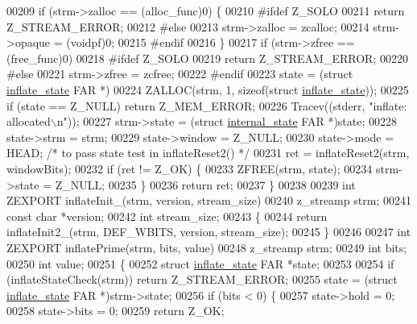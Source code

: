 \begin{DoxyCode}
00209     \textcolor{keywordflow}{if} (strm->zalloc == (alloc\_func)0) \{
00210 \textcolor{preprocessor}{#ifdef Z\_SOLO}
00211         \textcolor{keywordflow}{return} Z\_STREAM\_ERROR;
00212 \textcolor{preprocessor}{#else}
00213         strm->zalloc = zcalloc;
00214         strm->opaque = (voidpf)0;
00215 \textcolor{preprocessor}{#endif}
00216     \}
00217     \textcolor{keywordflow}{if} (strm->zfree == (free\_func)0)
00218 #ifdef Z\_SOLO
00219         \textcolor{keywordflow}{return} Z\_STREAM\_ERROR;
00220 \textcolor{preprocessor}{#else}
00221         strm->zfree = zcfree;
00222 \textcolor{preprocessor}{#endif}
00223     state = (\textcolor{keyword}{struct }\hyperlink{structinflate__state}{inflate\_state} FAR *)
00224             ZALLOC(strm, 1, \textcolor{keyword}{sizeof}(\textcolor{keyword}{struct} \hyperlink{structinflate__state}{inflate\_state}));
00225     \textcolor{keywordflow}{if} (state == Z\_NULL) \textcolor{keywordflow}{return} Z\_MEM\_ERROR;
00226     Tracev((stderr, \textcolor{stringliteral}{"inflate: allocated\(\backslash\)n"}));
00227     strm->state = (\textcolor{keyword}{struct }\hyperlink{structinternal__state}{internal\_state} FAR *)state;
00228     state->strm = strm;
00229     state->window = Z\_NULL;
00230     state->mode = HEAD;     \textcolor{comment}{/* to pass state test in inflateReset2() */}
00231     ret = inflateReset2(strm, windowBits);
00232     \textcolor{keywordflow}{if} (ret != Z\_OK) \{
00233         ZFREE(strm, state);
00234         strm->state = Z\_NULL;
00235     \}
00236     \textcolor{keywordflow}{return} ret;
00237 \}
00238 
00239 \textcolor{keywordtype}{int} ZEXPORT inflateInit\_(strm, version, stream\_size)
00240 z\_streamp strm;
00241 \textcolor{keyword}{const} \textcolor{keywordtype}{char} *version;
00242 \textcolor{keywordtype}{int} stream\_size;
00243 \{
00244     \textcolor{keywordflow}{return} inflateInit2\_(strm, DEF\_WBITS, version, stream\_size);
00245 \}
00246 
00247 \textcolor{keywordtype}{int} ZEXPORT inflatePrime(strm, bits, value)
00248 z\_streamp strm;
00249 \textcolor{keywordtype}{int} bits;
00250 \textcolor{keywordtype}{int} value;
00251 \{
00252     \textcolor{keyword}{struct }\hyperlink{structinflate__state}{inflate\_state} FAR *state;
00253 
00254     \textcolor{keywordflow}{if} (inflateStateCheck(strm)) \textcolor{keywordflow}{return} Z\_STREAM\_ERROR;
00255     state = (\textcolor{keyword}{struct }\hyperlink{structinflate__state}{inflate\_state} FAR *)strm->state;
00256     if (bits < 0) \{
00257         state->hold = 0;
00258         state->bits = 0;
00259         \textcolor{keywordflow}{return} Z\_OK;

\end{DoxyCode}
